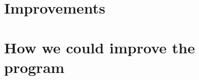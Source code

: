 \section{Improvements}\label{sec:improvements}


\section{How we could improve the program}\label{sec:do-differently}

